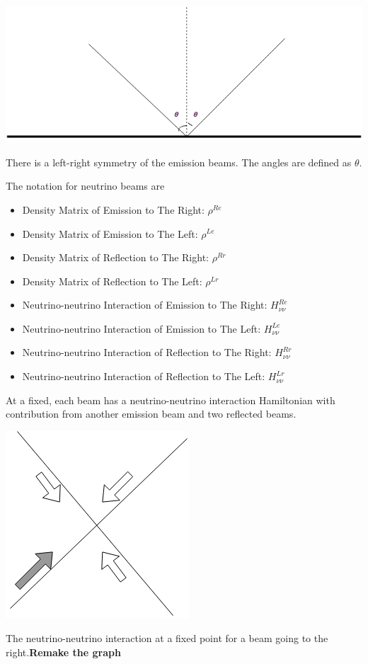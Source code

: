 \documentclass{tufte-handout}
\begin{document}
\begin{marginfigure}[2\baselineskip]
\includegraphics{assets/emissionAngles}
\caption{There is a left-right symmetry of the emission beams. The angles are defined as $\theta$.}
\end{marginfigure}

The notation for neutrino beams are

\begin{itemize}
\item Density Matrix of Emission to The Right:
$\rho^{Re}$
\item Density Matrix of Emission to The Left:
$\rho^{Le}$
\item Density Matrix of Reflection to The Right:
$\rho^{Rr}$
\item Density Matrix of Reflection to The Left:
$\rho^{Lr}$
\item Neutrino-neutrino Interaction of Emission to The Right:
$H_{\nu\nu}^{Re}$
\item Neutrino-neutrino Interaction of Emission to The Left:
$H_{\nu\nu}^{Le}$
\item Neutrino-neutrino Interaction of Reflection to The Right:
$H_{\nu\nu}^{Rr}$
\item Neutrino-neutrino Interaction of Reflection to The Left:
$H_{\nu\nu}^{Lr}$
\end{itemize}





At a fixed, each beam has a neutrino-neutrino interaction Hamiltonian with contribution from another emission beam and two reflected beams.

\begin{marginfigure}[7\baselineskip]
\includegraphics{assets/interactionAtPoint}
\caption{The neutrino-neutrino interaction at a fixed point for a beam going to the right.\newline \textbf{Remake the graph} }
\end{marginfigure}
\end{document}
